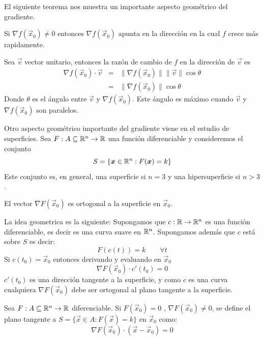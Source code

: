 El siguiente teorema nos muestra un importante aspecto geom\'etrico
del gradiente.
\begin{teorema}
Si $ \nabla f(\vec{x}_0)\neq 0 $ entonces $ \nabla f(\vec{x}_0) $ apunta en la
direcci\'on en la cual $ f $ crece m\'as rapidamente.
\end{teorema}
\begin{demostracion}
Sea $  \vec{v} $ vector unitario, entonces la raz\'on de cambio de $ f
$ en la direcci\'on de $ \vec{v} $ es
\begin{eqnarray*}
\nabla f(\vec{x}_0)\cdot \vec{v}  &=& \| \nabla f(\vec{x}_0) \|\|\vec{v}\|\cos\theta \\
                      &=& \|\nabla f(\vec{x}_0)\|\cos \theta 
\end{eqnarray*}
Donde $\theta$ es el \'angulo entre
$\vec{v}$ y $\nabla f(\vec{x}_0).$
Este \'angulo es m\'aximo cuando $ \vec{v} $ y $ \nabla f(\vec{x}_0) $ son
paralelos.
\end{demostracion}

\medskip

Otro aspecto geom\'etrico importante del gradiente viene en el
estudio de superficies.
Sea $ F:A\subseteq \mathbb{R}^n\rightarrow\mathbb{R} $ una funci\'on diferenciable
y consideremos el conjunto \[ S=\{ \boldsymbol{x} \in\mathbb{R}^n : F(\boldsymbol{x})=k
\}\]  Este conjunto es, en general, una superficie si $n=3$ y una
hipersuperficie si $n>3$. 

El
vector $ \nabla F(\vec{x}_0) $ es ortogonal a la superficie en
$ \vec{x}_0.$ 

La idea geometrica es la siguiente:
Supongamos que $ c:\mathbb{R}\rightarrow\mathbb{R}^n $ es una funci\'on
diferenciable, es decir es una curva suave en $ \mathbb{R}^n $.
Supongamos adem\'as que $ c $ est\'a sobre $ S $ es decir:
\[ F(c(t))=k \qquad \forall t\]
Si $ c(t_0)=\vec{x}_0 $ entonces derivando y evaluando en $ \vec{x}_0 $
\[ \nabla F(\vec{x}_0)\cdot c'(t_0)=0\]
$ c'(t_0) $ es una direcci\'on tangente a la superficie, 
y como $ c $ es una curva
cualquiera $ \nabla F(\vec{x}_0) $ debe ser ortogonal al plano tangente
a la superficie.

\begin{definicion}
Sea $ F:A\subseteq \mathbb{R}^n\rightarrow \mathbb{R} $  diferenciable. Si $
F(\vec{x}_0)=0 $ , $ \nabla F(\vec{x}_0)\neq 0 $, se define el plano tangente
 a $ S=\{ \vec{x} \in A : F(\vec{x})=k\} $ en $ \vec{x}_0 $
como:
\[ \nabla F(\vec{x}_0)\cdot(\vec{x}-\vec{x}_0)=0\]
\end{definicion}

